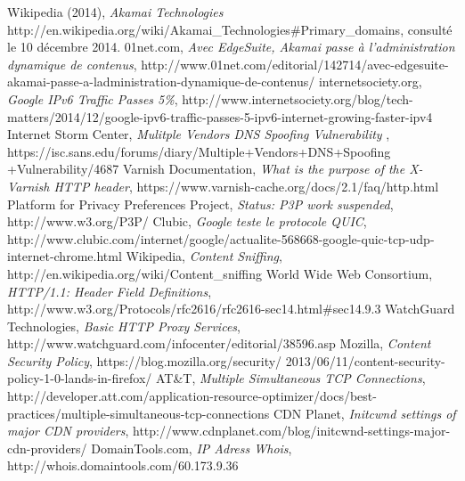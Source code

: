 \documentclass[conference]{IEEEtran}
\begin{document}
\begin{thebibliography}{1}

Wikipedia (2014), \emph{Akamai Technologies} http://en.wikipedia.org/wiki/Akamai\_Technologies\#Primary\_domains, consulté le 10 décembre 2014.
01net.com, \emph{Avec EdgeSuite, Akamai passe à l'administration dynamique de contenus},
http://www.01net.com/editorial/142714/avec-edgesuite-akamai-passe-a-ladministration-dynamique-de-contenus/
internetsociety.org, \emph{Google IPv6 Traffic Passes 5\%}, http://www.internetsociety.org/blog/tech-matters/2014/12/google-ipv6-traffic-passes-5-ipv6-internet-growing-faster-ipv4
Internet Storm Center, \emph{Mulitple Vendors DNS Spoofing Vulnerability} , https://isc.sans.edu/forums/diary/Multiple+Vendors+DNS+Spoofing +Vulnerability/4687
Varnish Documentation, \emph{What is the purpose of the X-Varnish HTTP header}, https://www.varnish-cache.org/docs/2.1/faq/http.html
Platform for Privacy Preferences Project, \emph{Status: P3P work suspended}, http://www.w3.org/P3P/
Clubic, \emph{Google teste le protocole QUIC}, http://www.clubic.com/internet/google/actualite-568668-google-quic-tcp-udp-internet-chrome.html
Wikipedia, \emph{Content Sniffing},  http://en.wikipedia.org/wiki/Content\_sniffing
World Wide Web Consortium, \emph{HTTP/1.1: Header Field Definitions}, http://www.w3.org/Protocols/rfc2616/rfc2616-sec14.html\#sec14.9.3
WatchGuard Technologies, \emph{Basic HTTP Proxy Services}, http://www.watchguard.com/infocenter/editorial/38596.asp
Mozilla, \emph{Content Security Policy}, https://blog.mozilla.org/security/ 2013/06/11/content-security-policy-1-0-lands-in-firefox/
AT\&T, \emph{Multiple Simultaneous TCP Connections}, http://developer.att.com/application-resource-optimizer/docs/best-practices/multiple-simultaneous-tcp-connections
CDN Planet, \emph{Initcwnd settings of major CDN providers}, http://www.cdnplanet.com/blog/initcwnd-settings-major-cdn-providers/
DomainTools.com, \emph{IP Adress Whois}, http://whois.domaintools.com/60.173.9.36
\end{thebibliography}




\end{document}
